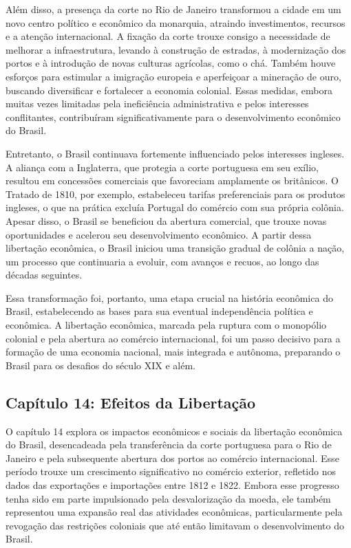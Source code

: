 \documentclass[a4paper,12pt]{article}[abntex2]
\begin{document}
Além disso, a presença da corte no Rio de Janeiro transformou a cidade em um novo centro político e econômico da monarquia, atraindo investimentos, recursos e a atenção internacional. A fixação da corte trouxe consigo a necessidade de melhorar a infraestrutura, levando à construção de estradas, à modernização dos portos e à introdução de novas culturas agrícolas, como o chá. Também houve esforços para estimular a imigração europeia e aperfeiçoar a mineração de ouro, buscando diversificar e fortalecer a economia colonial. Essas medidas, embora muitas vezes limitadas pela ineficiência administrativa e pelos interesses conflitantes, contribuíram significativamente para o desenvolvimento econômico do Brasil.

Entretanto, o Brasil continuava fortemente influenciado pelos interesses ingleses. A aliança com a Inglaterra, que protegia a corte portuguesa em seu exílio, resultou em concessões comerciais que favoreciam amplamente os britânicos. O Tratado de 1810, por exemplo, estabeleceu tarifas preferenciais para os produtos ingleses, o que na prática excluía Portugal do comércio com sua própria colônia. Apesar disso, o Brasil se beneficiou da abertura comercial, que trouxe novas oportunidades e acelerou seu desenvolvimento econômico. A partir dessa libertação econômica, o Brasil iniciou uma transição gradual de colônia a nação, um processo que continuaria a evoluir, com avanços e recuos, ao longo das décadas seguintes.

Essa transformação foi, portanto, uma etapa crucial na história econômica do Brasil, estabelecendo as bases para sua eventual independência política e econômica. A libertação econômica, marcada pela ruptura com o monopólio colonial e pela abertura ao comércio internacional, foi um passo decisivo para a formação de uma economia nacional, mais integrada e autônoma, preparando o Brasil para os desafios do século XIX e além.

\subsection{\textbf{Capítulo 14: Efeitos da Libertação}}

O capítulo 14 explora os impactos econômicos e sociais da libertação econômica do Brasil, desencadeada pela transferência da corte portuguesa para o Rio de Janeiro e pela subsequente abertura dos portos ao comércio internacional. Esse período trouxe um crescimento significativo no comércio exterior, refletido nos dados das exportações e importações entre 1812 e 1822. Embora esse progresso tenha sido em parte impulsionado pela desvalorização da moeda, ele também representou uma expansão real das atividades econômicas, particularmente pela revogação das restrições coloniais que até então limitavam o desenvolvimento do Brasil.
\end{document}
